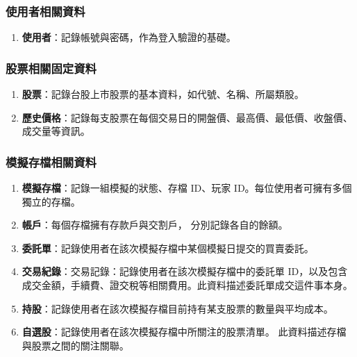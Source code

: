 \documentclass[UTF8, a4paper, 12pt, fontset=none]{ctexart}
\begin{document}
    \subsubsection*{使用者相關資料}
    \begin{enumerate}
        \item \textbf{使用者}：記錄帳號與密碼，作為登入驗證的基礎。
    \end{enumerate}
    \subsubsection*{股票相關固定資料}
    \begin{enumerate}
        \item \textbf{股票}：記錄台股上市股票的基本資料，如代號、名稱、所屬類股。
        \item \textbf{歷史價格}：記錄每支股票在每個交易日的開盤價、最高價、最低價、收盤價、成交量等資訊。
    \end{enumerate}
    \subsubsection*{模擬存檔相關資料}
    \begin{enumerate}
        \item \textbf{模擬存檔}：記錄一組模擬的狀態\footnotemark、存檔 ID、玩家 ID。每位使用者可擁有多個獨立的存檔。
        \item \textbf{帳戶}：每個存檔擁有存款戶與交割戶\footnotemark，
        分別記錄各自的餘額。
        
        \item \textbf{委託單}：記錄使用者在該次模擬存檔中某個模擬日提交的買賣委託\footnotemark。
        \item \textbf{交易紀錄}：交易記錄：記錄使用者在該次模擬存檔中的委託單 ID，以及包含成交金額，手續費、證交稅等相關費用。此資料描述委託單成交這件事本身。

        \item \textbf{持股}：記錄使用者在該次模擬存檔目前持有某支股票的數量與平均成本。

        \item \textbf{自選股}：記錄使用者在該次模擬存檔中所關注的股票清單。
        此資料描述存檔與股票之間的關注關聯。
        
    \end{enumerate}
\end{document}

